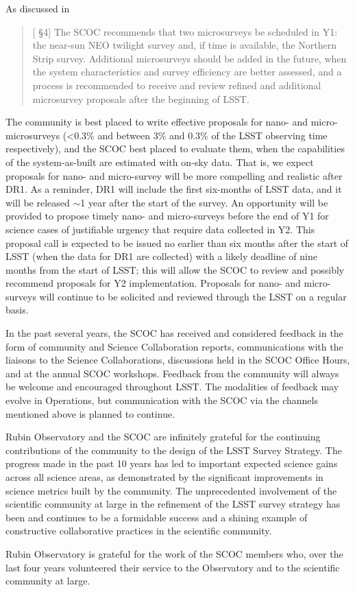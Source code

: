 As discussed in  
\begin{quote}
    {[ \S4] The SCOC recommends that two microsurveys be scheduled in Y1: the near-sun NEO twilight survey and, if time is available, the Northern Strip survey. Additional microsurveys should be added in the future, when the system characteristics and survey efficiency are better assessed, and a process is recommended to receive and review refined and additional microsurvey proposals after the beginning of LSST.}
\end{quote}

The community is best placed to write effective proposals for  nano- and micro-microsurveys (<0.3\% and between 3\% and 0.3\% of the LSST observing time respectively), and the SCOC best placed to evaluate them, when the capabilities of the system-as-built are estimated with on-sky data. That is, we expect proposals for nano- and micro-survey will be more compelling and realistic after DR1. As a reminder, DR1 will include the first six-months of LSST data, and it will be released \mbox{$\sim$1} year after the start of the survey. An opportunity will be provided to propose timely nano- and micro-surveys before the end of Y1 for science cases of justifiable urgency that require data collected in Y2. This proposal call is expected to be issued no earlier than six months after the start of LSST (when the data for DR1 are collected) with a likely deadline of nine months from the start of LSST; this will allow the SCOC to review and possibly recommend proposals for Y2 implementation. Proposals for nano- and micro-surveys will continue to be solicited and reviewed through the LSST on a regular basis. 

In the past several years, the SCOC has received and considered feedback in the form of community and Science Collaboration reports, communications with the liaisons to the Science Collaborations, discussions held in the SCOC Office Hours, and at the annual SCOC workshops. Feedback from the community will always be welcome and encouraged throughout LSST. The modalities of feedback may evolve in Operations, but communication with the SCOC via the channels mentioned above is planned to continue. 

Rubin Observatory and the SCOC are infinitely grateful for the continuing contributions of the community to the design of the LSST Survey Strategy. The progress made in the past 10 years has led to important expected science gains across all science areas, as demonstrated by the significant improvements in science metrics built by the community. The unprecedented involvement of the scientific community at large in the refinement of the LSST survey strategy has been and continues to be a formidable success and a shining example of constructive collaborative practices in the scientific community. 

Rubin Observatory is grateful for the work of the SCOC members who, over the last four years volunteered their service to the Observatory and to the scientific community at large.
 